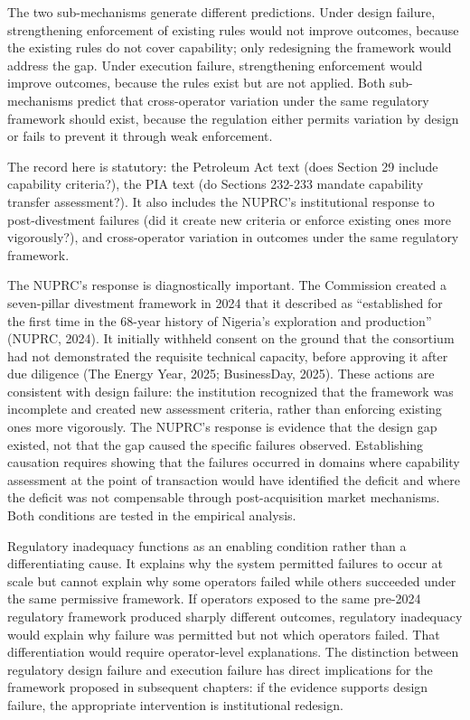 The two sub-mechanisms generate different predictions. Under design
failure, strengthening enforcement of existing rules would not improve
outcomes, because the existing rules do not cover capability; only
redesigning the framework would address the gap. Under execution
failure, strengthening enforcement would improve outcomes, because the
rules exist but are not applied. Both sub-mechanisms predict that
cross-operator variation under the same regulatory framework should
exist, because the regulation either permits variation by design or
fails to prevent it through weak enforcement.

The record here is statutory: the Petroleum Act text (does Section 29
include capability criteria?), the PIA text (do Sections 232-233 mandate
capability transfer assessment?). It also includes the NUPRC's
institutional response to post-divestment failures (did it create new
criteria or enforce existing ones more vigorously?), and cross-operator
variation in outcomes under the same regulatory framework.

The NUPRC's response is diagnostically important. The Commission created
a seven-pillar divestment framework in 2024 that it described as
``established for the first time in the 68-year history of Nigeria's
exploration and production'' (NUPRC, 2024). It initially withheld
consent on the ground that the consortium had not demonstrated the
requisite technical capacity, before approving it after due diligence
(The Energy Year, 2025; BusinessDay, 2025). These actions are consistent
with design failure: the institution recognized that the framework was
incomplete and created new assessment criteria, rather than enforcing
existing ones more vigorously. The NUPRC's response is evidence that the
design gap existed, not that the gap caused the specific failures
observed. Establishing causation requires showing that the failures
occurred in domains where capability assessment at the point of
transaction would have identified the deficit and where the deficit was
not compensable through post-acquisition market mechanisms. Both
conditions are tested in the empirical analysis.

Regulatory inadequacy functions as an enabling condition rather than a
differentiating cause. It explains why the system permitted failures to
occur at scale but cannot explain why some operators failed while others
succeeded under the same permissive framework. If operators exposed to
the same pre-2024 regulatory framework produced sharply different
outcomes, regulatory inadequacy would explain why failure was permitted
but not which operators failed. That differentiation would require
operator-level explanations. The distinction between regulatory design
failure and execution failure has direct implications for the framework
proposed in subsequent chapters: if the evidence supports design
failure, the appropriate intervention is institutional redesign.

